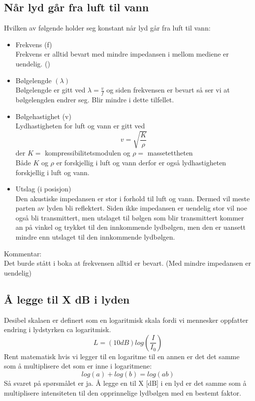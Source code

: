\documentclass[a4paper,12pt,norsk]{article}
\begin{document}
\subsection{Når lyd går fra luft til vann}
Hvilken av følgende holder seg konstant når lyd går fra luft til vann:
\begin{itemize}
\item Frekvens (f)\\
Frekvens er alltid bevart med mindre impedansen i mellom mediene er uendelig. (\cite{grl})
\item Bølgelengde $(\lambda)$\\
Bølgelengde er gitt ved $\lambda = \frac{v}{f}$ og siden frekvensen er bevart så ser vi at bølgelengden endrer seg. Blir mindre i dette tilfellet.
\item Bølgehastighet (v)\\
Lydhastigheten for luft og vann er gitt ved
$$
v = \sqrt{\frac{K}{\rho}} 
$$
der $K =$ kompressibilitetsmodulen og $\rho =$ massetettheten\\
Både $K$ og $\rho$ er forskjellig i luft og vann derfor er også lydhastigheten forskjellig i luft og vann.
\item Utslag (i posisjon)\\
Den akustiske impedansen er stor i forhold til luft og vann. Dermed vil meste parten av lyden bli reflektert. Siden ikke impedansen er uendelig stor vil noe også bli transmittert, men utslaget til bølgen som blir transmittert kommer an på vinkel og trykket til den innkommende lydbølgen, men den er uansett mindre enn utslaget til den innkommende lydbølgen.

\end{itemize}

Kommentar:\\
Det burde stått i boka at frekvensen alltid er bevart. (Med mindre impedansen er uendelig)

\subsection{Å legge til X dB i lyden}
Desibel skalaen er definert som en logaritmisk skala fordi vi mennesker oppfatter endring i lydstyrken ca logaritmisk. 
$$
L = (10dB)log\left( \frac{I}{I_0}\right)
$$
Rent matematisk hvis vi legger til en logaritme til en annen er det det samme som å multiplisere det som er inne i logaritmene:
$$
log(a)+log(b) = log(ab)
$$ 
Så svaret på spørsmålet er ja. Å legge en til X [dB] i en lyd er det samme som å multiplisere intensiteten til den opprinnelige lydbølgen med en bestemt faktor.
\end{document}
